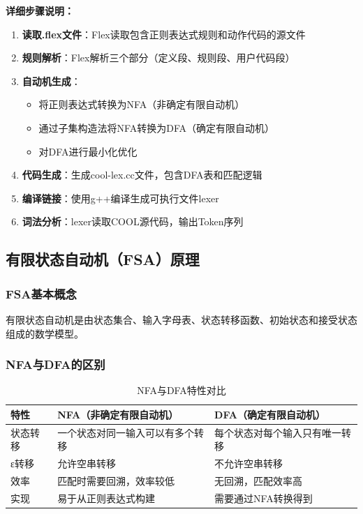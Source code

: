 \documentclass[twocolumn]{article}
\begin{document}
\textbf{详细步骤说明：}
\begin{enumerate}
    \item \textbf{读取.flex文件}：Flex读取包含正则表达式规则和动作代码的源文件
    \item \textbf{规则解析}：Flex解析三个部分（定义段、规则段、用户代码段）
    \item \textbf{自动机生成}：
    \begin{itemize}
        \item 将正则表达式转换为NFA（非确定有限自动机）
        \item 通过子集构造法将NFA转换为DFA（确定有限自动机）
        \item 对DFA进行最小化优化
    \end{itemize}
    \item \textbf{代码生成}：生成cool-lex.cc文件，包含DFA表和匹配逻辑
    \item \textbf{编译链接}：使用g++编译生成可执行文件lexer
    \item \textbf{词法分析}：lexer读取COOL源代码，输出Token序列
\end{enumerate}

\subsection{有限状态自动机（FSA）原理}

\subsubsection{FSA基本概念}
有限状态自动机是由状态集合、输入字母表、状态转移函数、初始状态和接受状态组成的数学模型。

\subsubsection{NFA与DFA的区别}
\begin{table}[H]
\centering
\begin{tabularx}{\linewidth}{|l|X|X|}
\hline
\textbf{特性} & \textbf{NFA（非确定有限自动机）} & \textbf{DFA（确定有限自动机）} \\
\hline
状态转移 & 一个状态对同一输入可以有多个转移 & 每个状态对每个输入只有唯一转移 \\
\hline
ε转移 & 允许空串转移 & 不允许空串转移 \\
\hline
效率 & 匹配时需要回溯，效率较低 & 无回溯，匹配效率高 \\
\hline
实现 & 易于从正则表达式构建 & 需要通过NFA转换得到 \\
\hline
\end{tabularx}
\caption{NFA与DFA特性对比}
\label{tab:nfa_dfa}
\end{table}
\end{document}
